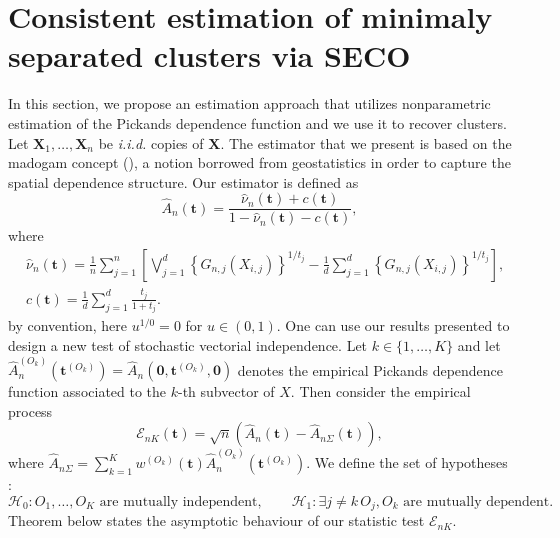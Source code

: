 \documentclass[11pt]{article}
\begin{document}
	\section{Consistent estimation of minimaly separated clusters via SECO}
	\label{sec:estimation}
	In this section, we propose an estimation approach that utilizes nonparametric estimation of the Pickands dependence function and we use it to recover clusters.
	Let $\textbf{X}_1, \dots, \textbf{X}_n$ be \emph{i.i.d.} copies of $\textbf{X}$. The estimator that we present is based on the madogam concept (\cite{cooley2006variograms, MARCON20171}), a notion borrowed from geostatistics in order to capture the spatial dependence structure. Our estimator is defined as 
	\begin{equation}
		\hat{A}_n(\textbf{t}) = \frac{\hat{\nu}_n(\textbf{t}) + c(\textbf{t})}{1-\hat{\nu}_n(\textbf{t})-c(\textbf{t})},
	\end{equation}
	where
	\begin{align*}
		& \hat{\nu}_n(\textbf{t}) = \frac{1}{n} \sum_{j=1}^n \left[\bigvee_{j=1}^d \left\{ G_{n,j} (X_{i,j}) \right\}^{1/t_j} - \frac{1}{d} \sum_{j=1}^d \left\{ G_{n,j}(X_{i,j}) \right\}^{1/t_j} \right], \\
		& c(\textbf{t}) = \frac{1}{d} \sum_{j=1}^d \frac{t_j}{1+t_j}.
	\end{align*}
	by convention, here $u^{1/0} = 0$ for $u \in (0,1)$. One can use our results presented to design a new test of stochastic vectorial independence. Let $k\in\{1,\dots,K\}$ and let $\hat{A}_{n}^{(O_k)}(\textbf{t}^{(O_k)}) = \hat{A}_n(\textbf{0},\textbf{t}^{(O_k)}, \textbf{0})$ denotes the empirical Pickands dependence function associated to the $k$-th subvector of $X$. Then consider the empirical process
	\begin{equation}
		\mathcal{E}_{nK} (\textbf{t}) = \sqrt{n}\left(\hat{A}_n(\textbf{t}) - \hat{A}_{n\Sigma}(\textbf{t}) \right),
	\end{equation}
	where $\hat{A}_{n\Sigma} = \sum_{k=1}^K w^{(O_k)}(\textbf{t}) \hat{A}_{n}^{(O_k)}(\textbf{t}^{(O_k)})$. We define the set of hypotheses :
	\begin{equation*}
		\mathcal{H}_0 : O_1, \dots, O_K \textrm{ are mutually independent}, \quad \quad \mathcal{H}_1 : \exists j \neq k \, O_j, O_k \textrm{ are mutually dependent}.
	\end{equation*}
	Theorem below states the asymptotic behaviour of our statistic test $\mathcal{E}_{nK}$.
\end{document}
